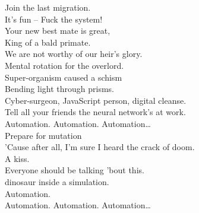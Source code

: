 
\label{album:kg}









Join the last migration. \\
It's fun -- Fuck the system! \\
Your new best mate is great, \\
King of a bald primate. \\
We are not worthy of our heir's glory. \\
Mental rotation for the overlord. \\

Super-organism caused a schism \\
Bending light through prisms. \\
Cyber-surgeon, JavaScript person, digital cleanse. \\
Tell all your friends the neural network's at work. \\

Automation. Automation. Automation… \\

Prepare for mutation \\
'Cause after all, I'm sure I heard the crack of doom. \\
A  kiss. \\
Everyone should be talking 'bout this. \\
  dinosaur inside a simulation. \\
Automation. \\

Automation. Automation. Automation… \\





